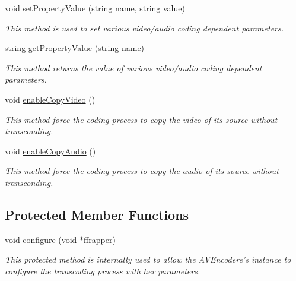 \begin{DoxyCompactItemize}
void \hyperlink{classbr_1_1ufscar_1_1lince_1_1xpta_1_1streaming_1_1AVEncoder_a9a623b8b8e47be5d61c47bf125f16483}{setPropertyValue} (string name, string value)
\begin{DoxyCompactList}\small\item\em This method is used to set various video/audio coding dependent parameters. \item\end{DoxyCompactList}\item 
string \hyperlink{classbr_1_1ufscar_1_1lince_1_1xpta_1_1streaming_1_1AVEncoder_a6b126762cca6defb9a4ad23aef22c883}{getPropertyValue} (string name)
\begin{DoxyCompactList}\small\item\em This method returns the value of various video/audio coding dependent parameters. \item\end{DoxyCompactList}\item 
void \hyperlink{classbr_1_1ufscar_1_1lince_1_1xpta_1_1streaming_1_1AVEncoder_af0ad1de4c1aee3cef2f1700fb69ccfcf}{enableCopyVideo} ()
\begin{DoxyCompactList}\small\item\em This method force the coding process to copy the video of its source without transconding. \item\end{DoxyCompactList}\item 
void \hyperlink{classbr_1_1ufscar_1_1lince_1_1xpta_1_1streaming_1_1AVEncoder_a4bb2b633a1fd7c42ae255b0badb49dae}{enableCopyAudio} ()
\begin{DoxyCompactList}\small\item\em This method force the coding process to copy the audio of its source without transconding. \item\end{DoxyCompactList}\end{DoxyCompactItemize}
\subsection*{Protected Member Functions}
\begin{DoxyCompactItemize}
\item 
void \hyperlink{classbr_1_1ufscar_1_1lince_1_1xpta_1_1streaming_1_1AVEncoder_ab2383236fa9ef21f14f90065257cd11f}{configure} (void $\ast$ffrapper)
\begin{DoxyCompactList}\small\item\em This protected method is internally used to allow the AVEncodere's instance to configure the transcoding process with her parameters. \item\end{DoxyCompactList}\end{DoxyCompactItemize}
